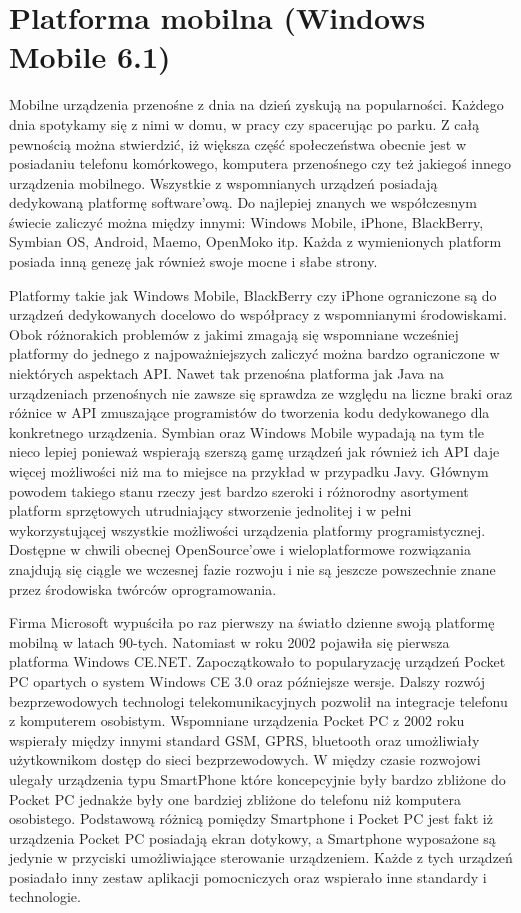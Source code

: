 \section{Platforma mobilna (Windows Mobile 6.1)}

Mobilne urządzenia przenośne z dnia na dzień zyskują na popularności. Każdego
dnia spotykamy się z nimi w domu, w pracy czy spacerując po parku. Z całą pewnością
można stwierdzić, iż większa część społeczeństwa obecnie jest w posiadaniu
telefonu komórkowego, komputera przenośnego czy też jakiegoś innego urządzenia
mobilnego. Wszystkie z wspomnianych urządzeń posiadają dedykowaną platformę
software'ową. Do najlepiej znanych we współczesnym świecie zaliczyć można między
innymi: Windows Mobile, iPhone, BlackBerry, Symbian OS, Android, Maemo, OpenMoko
itp. Każda z wymienionych platform posiada inną genezę jak również swoje mocne i
słabe strony.

Platformy takie jak Windows Mobile, BlackBerry czy iPhone ograniczone są do
urządzeń dedykowanych docelowo do współpracy z wspomnianymi środowiskami. Obok
różnorakich problemów z jakimi zmagają się wspomniane wcześniej platformy do
jednego z najpoważniejszych zaliczyć można bardzo ograniczone w niektórych
aspektach API. Nawet tak przenośna platforma jak Java na urządzeniach przenośnych
nie zawsze się sprawdza ze względu na liczne braki oraz różnice w API zmuszające
programistów do tworzenia kodu dedykowanego dla konkretnego urządzenia. Symbian
oraz Windows Mobile wypadają na tym tle nieco lepiej ponieważ wspierają szerszą
gamę urządzeń jak również ich API daje więcej możliwości niż ma to miejsce na
przykład w przypadku Javy. Głównym powodem takiego stanu rzeczy jest bardzo
szeroki i różnorodny asortyment platform sprzętowych utrudniający stworzenie
jednolitej i w pełni wykorzystującej wszystkie możliwości urządzenia platformy
programistycznej. Dostępne w chwili obecnej OpenSource'owe i wieloplatformowe
rozwiązania znajdują się ciągle we wczesnej fazie rozwoju i nie są jeszcze
powszechnie znane przez środowiska twórców oprogramowania.

Firma Microsoft wypuściła po raz pierwszy na światło dzienne swoją platformę
mobilną w latach 90-tych. Natomiast w roku 2002 pojawiła się pierwsza platforma
Windows CE.NET. Zapoczątkowało to popularyzację urządzeń Pocket PC opartych o
system Windows CE 3.0 oraz późniejsze wersje. Dalszy rozwój bezprzewodowych
technologi telekomunikacyjnych pozwolił na integracje telefonu z komputerem
osobistym. Wspomniane urządzenia Pocket PC z 2002 roku wspierały między innymi
standard GSM, GPRS, bluetooth oraz umożliwiały użytkownikom dostęp do sieci
bezprzewodowych. W między czasie rozwojowi ulegały urządzenia typu SmartPhone
które koncepcyjnie były bardzo zbliżone do Pocket PC jednakże były one bardziej
zbliżone do telefonu niż komputera osobistego. Podstawową różnicą pomiędzy
Smartphone i Pocket PC jest fakt iż urządzenia Pocket PC posiadają ekran
dotykowy, a Smartphone wyposażone są jedynie w przyciski umożliwiające sterowanie
urządzeniem. Każde z tych urządzeń posiadało inny zestaw aplikacji pomocniczych
oraz wspierało inne standardy i technologie.

